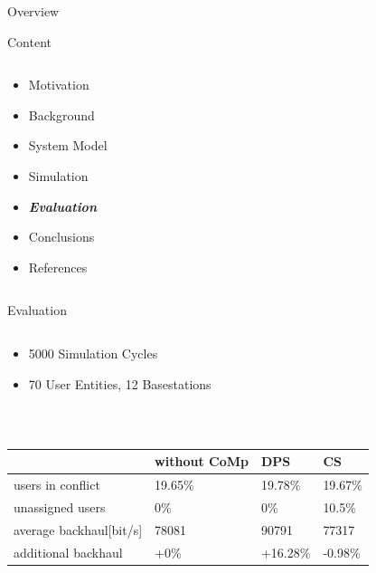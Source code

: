 \documentclass[xcolor={cmyk}]{beamer}
\begin{document}
\begin{frame}{Overview}
	\begin{block}{Content}
		\begin{columns}
			\begin{column}{.9\textwidth}
				\begin{itemize}
					\item Motivation
					\item Background
					\item System Model
					\item Simulation
					\item \textbf{\emph{Evaluation}}
					\item Conclusions
					\item References
				\end{itemize}
			\end{column}
		\end{columns}
	\end{block}
\end{frame}
 
 \begin{frame}{Evaluation}
	 \begin{block}{}
 \begin{columns}
			\begin{column}{.9\textwidth}
				\begin{itemize}
					\item 5000 Simulation Cycles
					\item 70 User Entities, 12 Basestations
				\end{itemize}
			\end{column}
		\end{columns} 
		\end{block}\ \\
	 \begin{tabular}{|l|l|l|l|}
	 \hline
	 & without CoMp & DPS & CS \\ \hline
	 users in conflict & 19.65\% & 19.78\% & 19.67\% \\ \hline
	 unassigned users & 0\% & 0\% & 10.5\% \\ \hline
	 average backhaul[bit/s] & 78081 & 90791 & 77317 \\ \hline
	 additional backhaul & +0\% & +16.28\% & -0.98\% \\ \hline
	
	 \end{tabular}

 \end{frame}
 
\end{document}
